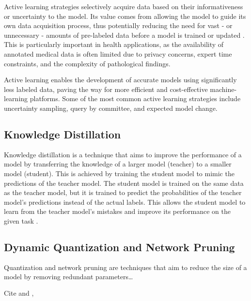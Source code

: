 \documentclass[../main.tex]{subfiles}
\begin{document}
     Active learning strategies selectively acquire data based on their informativeness or uncertainty to the model. Its value comes from allowing the model to guide its own data acquisition process, thus potentially reducing the need for vast - or unnecessary - amounts of pre-labeled data before a model is trained or updated \cite{huyen_designing_2022, chen_study_2015, figueroa_predicting_2012}. 
     This is particularly important in health applications, as the availability of annotated medical data is often limited due to privacy concerns, expert time constraints, and the complexity of pathological findings.
     
     Active learning enables the development of accurate models using significantly less labeled data, paving the way for more efficient and cost-effective machine-learning platforms. Some of the most common active learning strategies include uncertainty sampling, query by committee, and expected model change. 

     \subsection{Knowledge Distillation} \label{sec:knowledge_distillation}

    Knowledge distillation is a technique that aims to improve the performance of a model by transferring the knowledge of a larger model (teacher) to a smaller model (student). This is achieved by training the student model to mimic the predictions of the teacher model. The student model is trained on the same data as the teacher model, but it is trained to predict the probabilities of the teacher model's predictions instead of the actual labels. This allows the student model to learn from the teacher model's mistakes and improve its performance on the given task \cite{hinton_distilling_2015}.
    

    \subsection{Dynamic Quantization and Network Pruning} \label{sec:dynamic_quantization_pruning_sparsification}

    Quantization and network pruning are techniques that aim to reduce the size of a model by removing redundant parameters\dots

    Cite \cite{carreira-perpinan_model_2017} and \cite{han_deep_2016}, \cite{carreira-perpinan_compression_2018}
\end{document}
